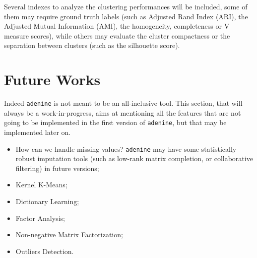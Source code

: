 \documentclass[paper=a4, fontsize=10pt]{scrartcl} %
\numberwithin{equation}{section} %
\numberwithin{figure}{section} %
\numberwithin{table}{section} %
\newcommand{\adenine}{{\tt adenine}\xspace}
\begin{document}
Several indexes to analyze the clustering performances will be included, some
of them may require ground truth labels (such as Adjusted Rand Index (ARI), the
Adjusted Mutual Information (AMI), the homogeneity, completeness or V measure
scores), while others may evaluate the cluster compactness or the separation
between clusters (such as the silhouette score).

\section{Future Works} \label{sec:future}

Indeed \adenine is not meant to be an all-inclusive tool. This section, that
will always be a work-in-progress, aims at mentioning all the features that
are not going to be implemented in the first version of \adenine, but that may
be implemented later on.

\begin{itemize}

	\item How can we handle missing values? \adenine may have some statistically robust
	imputation tools (such as low-rank matrix completion, or collaborative filtering) in
	future versions;

	\item Kernel K-Means;

	\item Dictionary Learning;

	\item Factor Analysis;

	\item Non-negative Matrix Factorization;

	\item Outliers Detection.

\end{itemize}
\end{document}
